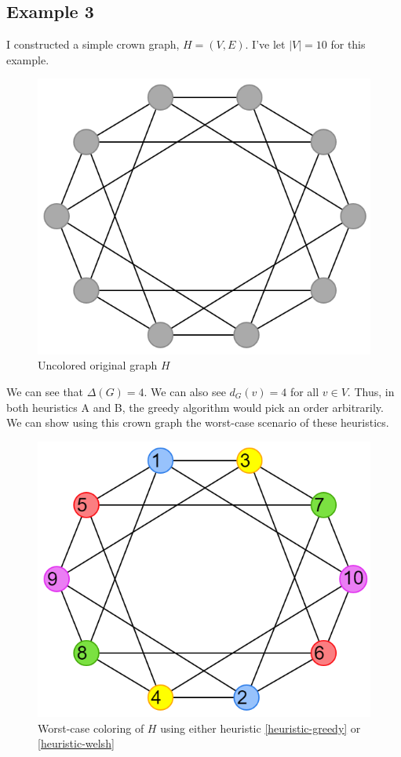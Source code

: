 \documentclass{article}
\newcounter{heuristic} \setcounter{heuristic}{0}
\theoremstyle{definition}
\begin{document}
\subsection*{Example 3}

I constructed a simple crown graph, \(H = (V, E)\). I've let \(|V| = 10\) for this example.

\begin{figure}[H]
\centering
\includegraphics[scale=0.38]{images/graph-4.png}
\caption{Uncolored original graph \(H\)}
\end{figure}

We can see that \(\Delta(G) = 4\). We can also see \(d_G(v) = 4\) for all \(v \in V\). Thus, in both heuristics A and B, the greedy algorithm would pick an order arbitrarily. We can show using this crown graph the worst-case scenario of these heuristics.

\begin{figure}[H]
\centering
\includegraphics[scale=0.38]{images/graph-5.png}
\caption{Worst-case coloring of \(H\) using either heuristic \ref{heuristic-greedy} or \ref{heuristic-welsh}}
\end{figure}
\end{document}
